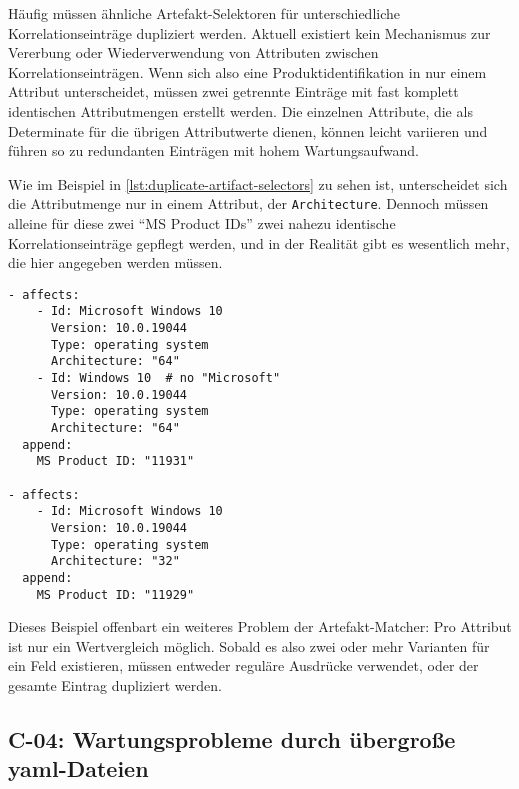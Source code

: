 Häufig müssen ähnliche Artefakt-Selektoren für unterschiedliche Korrelationseinträge dupliziert werden.
Aktuell existiert kein Mechanismus zur Vererbung oder Wiederverwendung von Attributen zwischen Korrelationseinträgen.
Wenn sich also eine Produktidentifikation in nur einem Attribut unterscheidet, müssen zwei getrennte Einträge mit fast komplett identischen Attributmengen erstellt werden.
Die einzelnen Attribute, die als Determinate für die übrigen Attributwerte dienen, können leicht variieren und führen so zu redundanten Einträgen mit hohem Wartungsaufwand.

Wie im Beispiel in \autoref{lst:duplicate-artifact-selectors} zu sehen ist, unterscheidet sich die Attributmenge nur in einem Attribut, der \texttt{Architecture}.
Dennoch müssen alleine für diese zwei \enquote{MS Product IDs} zwei nahezu identische Korrelationseinträge gepflegt werden, und in der Realität gibt es wesentlich mehr, die hier angegeben werden müssen.

\begin{lstlisting}[style=yaml,caption={Zwei Korrelationseinträge mit nahezu identischen Attributen},label={lst:duplicate-artifact-selectors}]
- affects:
    - Id: Microsoft Windows 10
      Version: 10.0.19044
      Type: operating system
      Architecture: "64"
    - Id: Windows 10  # no "Microsoft"
      Version: 10.0.19044
      Type: operating system
      Architecture: "64"
  append:
    MS Product ID: "11931"

- affects:
    - Id: Microsoft Windows 10
      Version: 10.0.19044
      Type: operating system
      Architecture: "32"
  append:
    MS Product ID: "11929"
\end{lstlisting}

Dieses Beispiel offenbart ein weiteres Problem der Artefakt-Matcher:
Pro Attribut ist nur ein Wertvergleich möglich.
Sobald es also zwei oder mehr Varianten für ein Feld existieren, müssen entweder reguläre Ausdrücke verwendet, oder der gesamte Eintrag dupliziert werden.

\subsection{C-04: Wartungsprobleme durch übergroße \acrshort{yaml}-Dateien}\label{subsec:c-04-groe-und-unubersichtliche-yaml-dateien}


